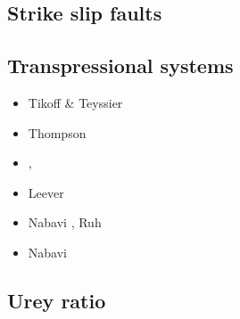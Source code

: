 \subsection{Strike slip faults} 


\textcite{tusp74}







\subsection{Transpressional systems} 

\begin{scriptsize}
\begin{itemize}
\item[\nineteenninetyfour] Tikoff \& Teyssier \cite{tite94}
\item[\nineteenninetyseven] Thompson \etal \cite{thsj97}
\item[\twothousandthree] \textcite{konc03}, \textcite{upke03}
\item[\twothousandeleven] Leever \etal \cite{legs11}
\item[\twothousandseventeen] Nabavi \etal \cite{naam17}, Ruh \etal \cite{rugb17}
\item[\twothousandeighteen] Nabavi \etal \cite{naam18}
\end{itemize}
\end{scriptsize}

\subsection{Urey ratio}

